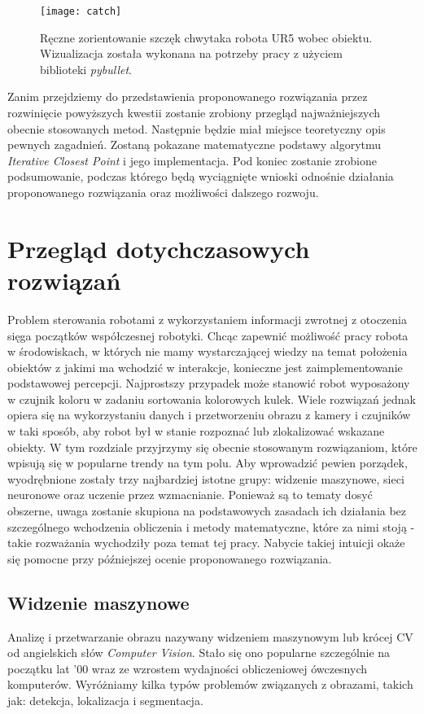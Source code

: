 \documentclass{article}
\begin{document}
\begin{figure}[h]
\centering
\texttt{[image: catch]}
\caption{Ręczne zorientowanie szczęk chwytaka robota UR5 wobec obiektu. Wizualizacja została wykonana na potrzeby pracy z użyciem biblioteki \emph{pybullet}.}
\end{figure}

Zanim przejdziemy do przedstawienia proponowanego rozwiązania przez rozwinięcie powyższych kwestii zostanie zrobiony przegląd najważniejszych obecnie stosowanych metod. Następnie będzie miał miejsce teoretyczny opis pewnych zagadnień. Zostaną pokazane matematyczne podstawy algorytmu \emph{Iterative Closest Point} i jego implementacja. Pod koniec zostanie zrobione podsumowanie, podczas którego będą wyciągnięte wnioski odnośnie działania proponowanego rozwiązania oraz możliwości dalszego rozwoju.

\newpage
\section{\LARGE{Przegląd dotychczasowych rozwiązań}}
Problem sterowania robotami z wykorzystaniem informacji zwrotnej z otoczenia sięga początków współczesnej robotyki. Chcąc zapewnić możliwość pracy robota w środowiskach, w których nie mamy wystarczającej wiedzy na temat położenia obiektów z jakimi ma wchodzić w interakcje, konieczne jest zaimplementowanie podstawowej percepcji. Najprostszy przypadek może stanowić robot wyposażony w czujnik koloru w zadaniu sortowania kolorowych kulek. Wiele rozwiązań jednak opiera się na wykorzystaniu danych i przetworzeniu obrazu z kamery i czujników w taki sposób, aby robot był w stanie rozpoznać lub zlokalizować wskazane obiekty. W tym rozdziale przyjrzymy się obecnie stosowanym rozwiązaniom, które wpisują się w popularne trendy na tym polu. Aby wprowadzić pewien porządek, wyodrębnione zostały trzy najbardziej istotne grupy: widzenie maszynowe, sieci neuronowe oraz uczenie przez wzmacnianie. Ponieważ są to tematy dosyć obszerne, uwaga zostanie skupiona na podstawowych zasadach ich działania bez szczególnego wchodzenia obliczenia i metody matematyczne, które za nimi stoją - takie rozważania wychodziły poza temat tej pracy. Nabycie takiej intuicji okaże się pomocne przy późniejszej ocenie proponowanego rozwiązania.

\subsection{\LARGE{Widzenie maszynowe}}
Analizę i przetwarzanie obrazu nazywany widzeniem maszynowym lub krócej CV od angielskich słów \emph{Computer Vision}. Stało się ono popularne szczególnie na początku lat '00 wraz ze wzrostem wydajności obliczeniowej ówczesnych komputerów. Wyróżniamy kilka typów problemów związanych z obrazami, takich jak: detekcja, lokalizacja i segmentacja.
\end{document}
